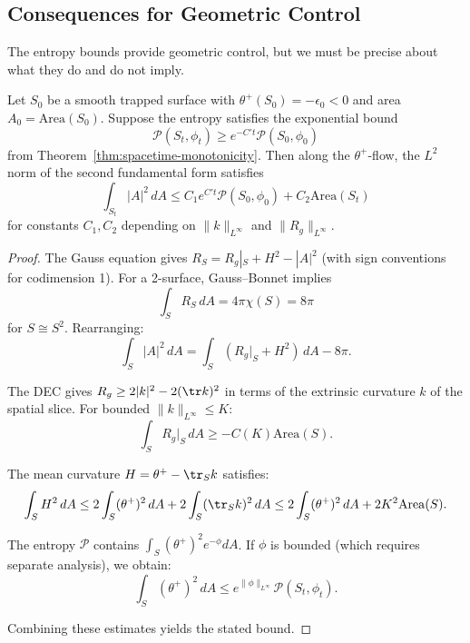 \subsection{Consequences for Geometric Control}

The entropy bounds provide geometric control, but we must be precise about what they do and do not imply.

\begin{corollary}
\label{cor:curvature-bounds}
Let $S_0$ be a smooth trapped surface with $\theta^+(S_0) = -\epsilon_0 < 0$ and area $A_0 = \mathrm{Area}(S_0)$. Suppose the entropy satisfies the exponential bound
\begin{equation}
\mathcal{P}(S_t, \phi_t) \geq e^{-C't}\mathcal{P}(S_0, \phi_0)
\end{equation}
from Theorem~\ref{thm:spacetime-monotonicity}. Then along the $\theta^+$-flow, the $L^2$ norm of the second fundamental form satisfies
\begin{equation}
\int_{S_t} |A|^2 \, dA \leq C_1 e^{C't}\mathcal{P}(S_0, \phi_0) + C_2 \mathrm{Area}(S_t)
\end{equation}
for constants $C_1, C_2$ depending on $\|k\|_{L^\infty}$ and $\|R_g\|_{L^\infty}$.
\end{corollary}

\begin{proof}
The Gauss equation gives $R_S = R_g|_S + H^2 - |A|^2$ (with sign conventions for codimension 1). For a 2-surface, Gauss--Bonnet implies
\begin{equation}
\int_S R_S \, dA = 4\pi \chi(S) = 8\pi
\end{equation}
for $S \cong S^2$. Rearranging:
\begin{equation}
\int_S |A|^2 \, dA = \int_S (R_g|_S + H^2) \, dA - 8\pi.
\end{equation}

The DEC gives $R_g \geq 2|k|^2 - 2(\tr k)^2$ in terms of the extrinsic curvature $k$ of the spatial slice. For bounded $\|k\|_{L^\infty} \leq K$:
\begin{equation}
\int_S R_g|_S \, dA \geq -C(K) \mathrm{Area}(S).
\end{equation}

The mean curvature $H = \theta^+ - \tr_S k$ satisfies:
\begin{equation}
\int_S H^2 \, dA \leq 2\int_S (\theta^+)^2 \, dA + 2\int_S (\tr_S k)^2 \, dA \leq 2\int_S (\theta^+)^2 \, dA + 2K^2 \mathrm{Area}(S).
\end{equation}

The entropy $\mathcal{P}$ contains $\int_S (\theta^+)^2 e^{-\phi} dA$. If $\phi$ is bounded (which requires separate analysis), we obtain:
\begin{equation}
\int_S (\theta^+)^2 \, dA \leq e^{\|\phi\|_{L^\infty}} \mathcal{P}(S_t, \phi_t).
\end{equation}

Combining these estimates yields the stated bound.
\end{proof}

